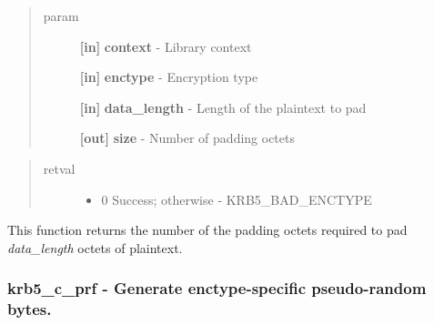 \documentclass[letterpaper,10pt,english]{sphinxmanual}
\begin{document}
\begin{quote}\begin{description}
\item[{param}] \leavevmode
\textbf{{[}in{]}} \textbf{context} - Library context

\textbf{{[}in{]}} \textbf{enctype} - Encryption type

\textbf{{[}in{]}} \textbf{data\_length} - Length of the plaintext to pad

\textbf{{[}out{]}} \textbf{size} - Number of padding octets

\end{description}\end{quote}
\begin{quote}\begin{description}
\item[{retval}] \leavevmode\begin{itemize}
\item {} 
0   Success; otherwise - KRB5\_BAD\_ENCTYPE

\end{itemize}

\end{description}\end{quote}

This function returns the number of the padding octets required to pad \emph{data\_length} octets of plaintext.


\subsubsection{krb5\_c\_prf -  Generate enctype-specific pseudo-random bytes.}
\label{appdev/refs/api/krb5_c_prf:krb5-c-prf-generate-enctype-specific-pseudo-random-bytes}\label{appdev/refs/api/krb5_c_prf::doc}

\begin{fulllineitems}
\label{appdev/refs/api/krb5_c_prf:c.krb5_c_prf}
\end{fulllineitems}
\end{document}

